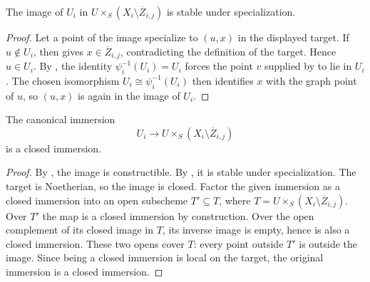\begin{lemma}
  \label{lemma:nagata-intermediate-overlap-specialization-closed}

  The image of $U_i$ in
  $U\times_S(X_i\setminus\overline Z_{i,j})$ is stable under specialization.
\end{lemma}

\begin{proof}
  Let a point of the image specialize to $(u,x)$ in the displayed target.  If
  $u\notin U_i$, then
   gives
  $x\in\overline Z_{i,j}$, contradicting the definition of the target.
  Hence $u\in U_i$.  By
  , the identity
  $\psi_i^{-1}(U_i)=U_i$ forces the point $v$ supplied by
   to lie in $U_i$.
  The chosen isomorphism $U_i\cong\psi_i^{-1}(U_i)$ then identifies $x$ with
  the graph point of $u$, so $(u,x)$ is again in the image of $U_i$.
\end{proof}

\begin{lemma}
  \label{lemma:nagata-intermediate-overlap-closed}

  The canonical immersion
  \[
    U_i\longrightarrow
    U\times_S(X_i\setminus\overline Z_{i,j})
  \]
  is a closed immersion.
\end{lemma}

\begin{proof}
  By , the image is
  constructible.  By
  , it is stable
  under specialization.  The target is Noetherian, so the image is closed.
  Factor the given immersion as a closed immersion into an open subscheme
  $T'\subseteq T$, where
  $T=U\times_S(X_i\setminus\overline Z_{i,j})$.  Over $T'$ the map is a
  closed immersion by construction.  Over the open complement of its closed
  image in $T$, its inverse image is empty, hence is also a closed immersion.
  These two opens cover $T$: every point outside $T'$ is outside the image.
  Since being a closed immersion is local on the target, the original
  immersion is a closed immersion.
\end{proof}

